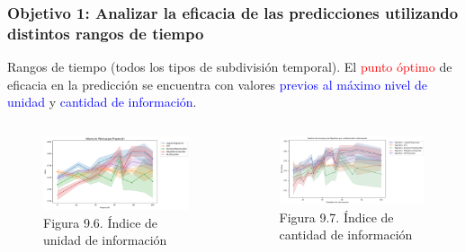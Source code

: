 \documentclass{beamer}
\begin{document}
\begin{frame}
	\frametitle{Objetivo 1: Analizar la eficacia de las predicciones utilizando distintos rangos de tiempo}
\begin{block}{Rangos de tiempo (todos los tipos de subdivisión temporal).} 
	El \textcolor{red}{punto óptimo} de eficacia en la predicción se encuentra con valores \textcolor{blue}{previos al máximo nivel de unidad} y \textcolor{blue}{cantidad de información}.

	\end{block}
	\begin{columns}[c]
		\begin{column}{.5\textwidth}
			\begin{figure}
				\centering
				\includegraphics[width=1\textwidth]{figs/cap7/figura_12}
				\caption{Figura 9.6. Índice de unidad de información}
			\end{figure}      
		\end{column}
		\begin{column}{.5\textwidth}
			\begin{figure}
				\centering
				\includegraphics[width=1\textwidth]{figs/cap7/figura_13}
				\caption{Figura 9.7. Índice de cantidad de información}
			\end{figure}
		\end{column}
	\end{columns}

	
\end{frame}
\end{document}
